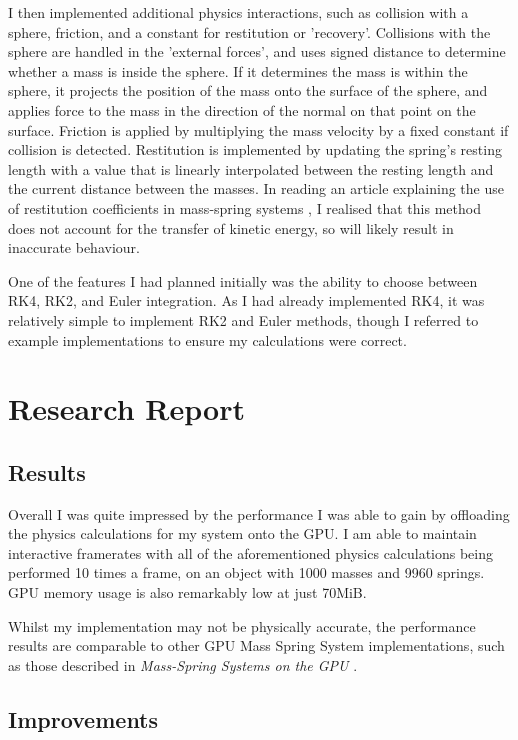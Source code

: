 \documentclass[]{acmsiggraph}
\begin{document}
I then implemented additional physics interactions, such as collision with a sphere, friction, and a constant for restitution or 'recovery'. Collisions with the sphere are handled in the 'external forces', and uses signed distance to determine whether a mass is inside the sphere. If it determines the mass is within the sphere, it projects the position of the mass onto the surface of the sphere, and applies force to the mass in the direction of the normal on that point on the surface. Friction is applied by multiplying the mass velocity by a fixed constant if collision is detected. Restitution is implemented by updating the spring's resting length with a value that is linearly interpolated between the resting length and the current distance between the masses. In reading an article explaining the use of restitution coefficients in mass-spring systems \cite{restitution}, I realised that this method does not account for the transfer of kinetic energy, so will likely result in inaccurate behaviour.

One of the features I had planned initially was the ability to choose between RK4, RK2, and Euler integration. As I had already implemented RK4, it was relatively simple to implement RK2 and Euler methods, though I referred to example implementations \cite{integrators} to ensure my calculations were correct.

\section{Research Report} \label{sec:report}

\subsection{Results}

Overall I was quite impressed by the performance I was able to gain by offloading the physics calculations for my system onto the GPU. I am able to maintain interactive framerates with all of the aforementioned physics calculations being performed 10 times a frame, on an object with 1000 masses and 9960 springs. GPU memory usage is also remarkably low at just 70MiB.

Whilst my implementation may not be physically accurate, the performance results are comparable to other GPU Mass Spring System implementations, such as those described in \textit{Mass-Spring Systems on the GPU} \cite{massSpringGPU}.

\subsection{Improvements}
\end{document}

